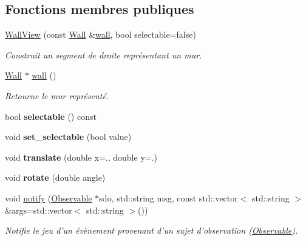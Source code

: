 \subsection*{Fonctions membres publiques}
\begin{DoxyCompactItemize}
\item 
\hyperlink{classWallView_acd55794debfd67a8f2b9088d3fb2e0dc}{Wall\+View} (const \hyperlink{classWall}{Wall} \&\hyperlink{classWallView_af93a05e8e527a55158707802c2f16911}{wall}, bool selectable=false)
\begin{DoxyCompactList}\small\item\em Construit un segment de droite représentant un mur. \end{DoxyCompactList}\item 
\hyperlink{classWall}{Wall} $\ast$ \hyperlink{classWallView_af93a05e8e527a55158707802c2f16911}{wall} ()
\begin{DoxyCompactList}\small\item\em Retourne le mur représenté. \end{DoxyCompactList}\item 
\hypertarget{classWallView_a674eb428edf9826a41616bc3f8618044}{bool {\bfseries selectable} () const }\label{classWallView_a674eb428edf9826a41616bc3f8618044}

\item 
\hypertarget{classWallView_ab47e5401e6addcc68d84f702800cc282}{void {\bfseries set\+\_\+selectable} (bool value)}\label{classWallView_ab47e5401e6addcc68d84f702800cc282}

\item 
\hypertarget{classWallView_ae0a076aeec6ff504c6daacd5900400ec}{void {\bfseries translate} (double x=., double y=.)}\label{classWallView_ae0a076aeec6ff504c6daacd5900400ec}

\item 
\hypertarget{classWallView_a76fa8b376ea01d443754251210232f78}{void {\bfseries rotate} (double angle)}\label{classWallView_a76fa8b376ea01d443754251210232f78}

\item 
void \hyperlink{classWallView_a193f9046366f016fd6361caa7ff1b710}{notify} (\hyperlink{classObservable}{Observable} $\ast$sdo, std\+::string msg, const std\+::vector$<$ std\+::string $>$ \&args=std\+::vector$<$ std\+::string $>$())
\begin{DoxyCompactList}\small\item\em Notifie le jeu d'un évènement provenant d'un sujet d'observation (\hyperlink{classObservable}{Observable}). \end{DoxyCompactList}\end{DoxyCompactItemize}
